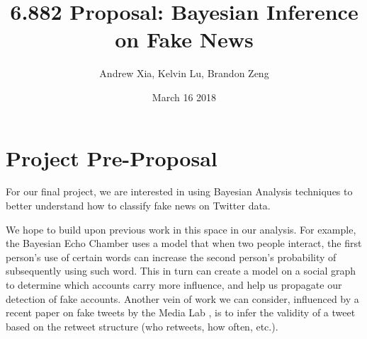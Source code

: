 \documentclass{article}
\title{6.882 Proposal: Bayesian Inference on Fake News}
\author{Andrew Xia, Kelvin Lu, Brandon Zeng}
\date{March 16 2018}
\begin{document}
\maketitle

\section{Project Pre-Proposal}

For our final project, we are interested in using Bayesian Analysis techniques to better understand how to classify fake news on Twitter data. 

We hope to build upon previous work in this space in our analysis. For example, the Bayesian Echo Chamber \cite{bayes_echo} uses a model that when two people interact, the first person's use of certain words can increase the second person’s probability of subsequently using such word. This in turn can create a model on a social graph to determine which accounts carry more influence, and help us propagate our detection of fake accounts. Another vein of work we can consider, influenced by a recent paper on fake tweets by the Media Lab \cite{medialab}, is to infer the validity of a tweet based on the retweet structure (who retweets, how often, etc.).

\nocite{*}


\end{document}
